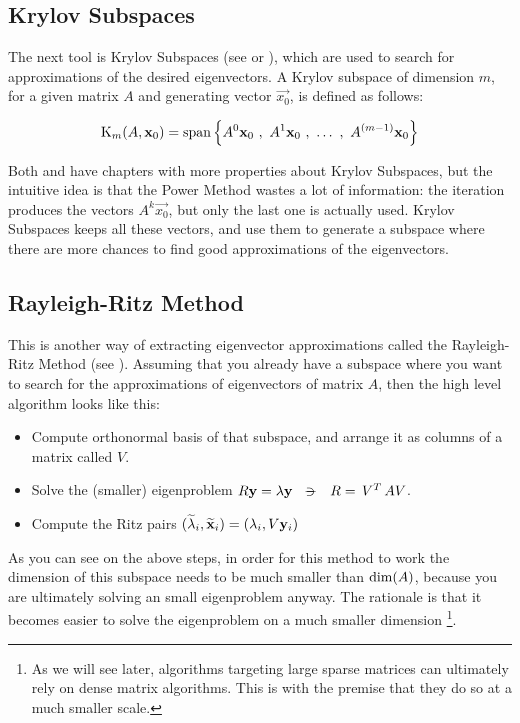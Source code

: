 \subsection{Krylov Subspaces}

The next tool is Krylov Subspaces (see \cite{parlett80} or
\cite{saad92}), which are used to search for 
approximations of the desired eigenvectors. A Krylov subspace of
dimension $m$, for a given matrix $A$ and generating vector
$\vec{x_0}$, is defined as follows: 

\begin{equation*}
    \Krylov{A}{\vec{x}_0}{m} =
    \func{span}
    \left\{
      A^0\vec{x}_0\ds{,} A^1\vec{x}_0\ds{,} \ldots \ds{,}  A^{(m-1)}\vec{x}_0
      \right\}  
\end{equation*}
\joinbelow{1cm}

Both \cite{parlett80} and \cite{saad92} have chapters with more
properties about Krylov Subspaces, but the intuitive idea is that the
Power Method wastes a lot of information: the iteration
produces the vectors $A^k\vec{x_0}$, but only the last one is actually
used. Krylov Subspaces keeps all these vectors, and use them to
generate a subspace where there are more chances to find good
approximations of the eigenvectors.

\subsection{Rayleigh-Ritz Method}

This is another way of extracting eigenvector approximations called
the Rayleigh-Ritz Method (see \cite{saad92}). Assuming
that you 
already have a subspace where you want to search for the
approximations of eigenvectors of matrix $A$, then the high level
algorithm looks like this: 

\begin{itemize}
  \item Compute orthonormal basis of that subspace, and arrange it as
    columns of a matrix called $V$.
  \item Solve the (smaller) eigenproblem $R\vec{y} = \lambda\vec{y}
    \ds{\suchthat} R = \trans{V} A V$. 
  \item Compute the Ritz pairs
      $(\apx{\lambda}_i,\apx{\vec{x}}_i) = (\lambda_i, V\vec{y}_i)$
\end{itemize}

As you can see on the above steps, in order for this method to work
the dimension of this subspace  needs to be much smaller than
$\func{dim}(A)$, because you are ultimately solving an small
eigenproblem anyway.  The rationale is that it becomes easier to
solve the eigenproblem on a much smaller dimension \footnote{As we
  will see later, algorithms targeting large sparse matrices can
  ultimately rely on dense matrix algorithms. This is with the premise that
  they do so at a much smaller scale.}. \\

